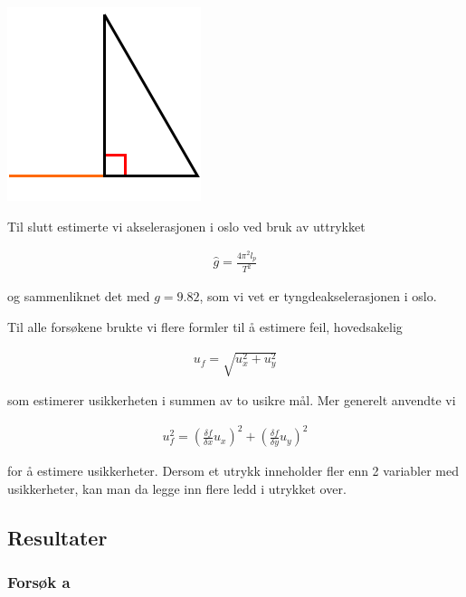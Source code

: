 \hfil
\includegraphics[scale = 0.8]{Figurer/Pendel_Lab1_c.png} 
\par \bigskip

Til slutt estimerte vi akselerasjonen i oslo ved bruk av uttrykket 

\begin{align}
    \hat{g} = \frac{4\pi^2l_p}{T^2}\label{ghat}
\end{align}

og sammenliknet det med $g = 9.82$, som vi vet er tyngdeakselerasjonen i oslo.
\bigskip

Til alle forsøkene brukte vi flere formler til å estimere feil, hovedsakelig

\begin{align}
    u_f = \sqrt{u_x^2 +u_y^2}\label{au}
\end{align}


som estimerer usikkerheten i summen av to usikre mål. Mer generelt anvendte vi 

\begin{align}
    u_f^2 = \left(\frac{\delta f}{\delta x} u_x\right)^2 + \left(\frac{\delta f}{\delta y} u_y\right)^2\label{gu}
\end{align}

for å estimere usikkerheter. Dersom et utrykk inneholder fler enn 2 variabler med usikkerheter, kan man da legge inn flere ledd i utrykket over.

\subsection{Resultater}

\subsubsection*{Forsøk a}

